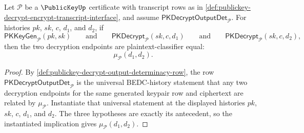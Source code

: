 \begin{theorem}
\label{thm:publickey-decrypt-output-determinacy}
Let $\mathcal P$ be a $\PublicKeyUp$ certificate with transcript rows as in \autoref{def:publickey-decrypt-encrypt-transcript-interface}, and assume $\mathsf{PKDecryptOutputDet}_{\mathcal P}$. For histories $pk$, $sk$, $c$, $d_1$, and $d_2$, if
$$
\mathsf{PKKeyGen}_{\mathcal P}(pk,sk)
\qquad\text{and}\qquad
\mathsf{PKDecrypt}_{\mathcal P}(sk,c,d_1)
\qquad\text{and}\qquad
\mathsf{PKDecrypt}_{\mathcal P}(sk,c,d_2),
$$
then the two decryption endpoints are plaintext-classifier equal:
$$
\mu_{\mathcal P}(d_1,d_2).
$$
\end{theorem}
\begin{proof}
By \autoref{def:publickey-decrypt-output-determinacy-row}, the row $\mathsf{PKDecryptOutputDet}_{\mathcal P}$ is the universal BEDC-history statement that any two decryption endpoints for the same generated keypair row and ciphertext are related by $\mu_{\mathcal P}$. Instantiate that universal statement at the displayed histories $pk$, $sk$, $c$, $d_1$, and $d_2$. The three hypotheses are exactly its antecedent, so the instantiated implication gives $\mu_{\mathcal P}(d_1,d_2)$.
\end{proof}

